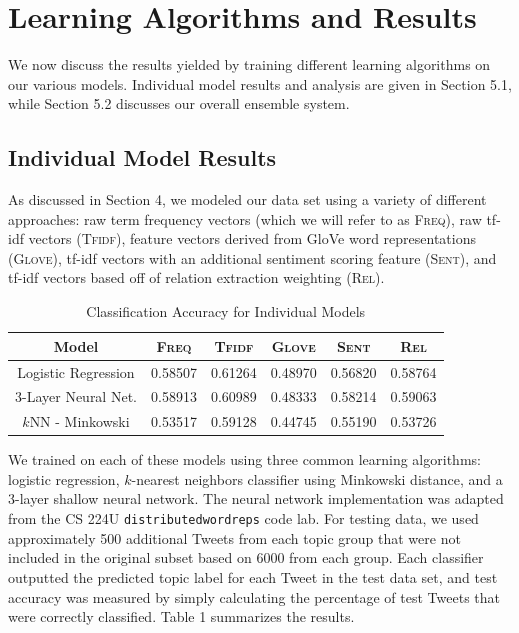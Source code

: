 \documentclass[11pt]{article}
\begin{document}
\section{Learning Algorithms and Results}

We now discuss the results yielded by training different learning algorithms on our various models. Individual model results and analysis are given in Section 5.1, while Section 5.2 discusses our overall ensemble system.

\subsection{Individual Model Results}

As discussed in Section 4, we modeled our data set using a variety of different approaches: raw term frequency vectors (which we will refer to as \textsc{Freq}), raw tf-idf vectors (\textsc{Tfidf}), feature vectors derived from GloVe word representations (\textsc{Glove}), tf-idf vectors with an additional sentiment scoring feature (\textsc{Sent}), and tf-idf vectors based off of relation extraction weighting (\textsc{Rel}).

\begin{table}[]
  \centering
  \begin{tabular}{|c||c|c|c|c|c|}
  \hline \textbf{Model} & \textsc{Freq} & \textsc{Tfidf} & \textsc{Glove} & \textsc{Sent} & \textsc{Rel} \\ \hline \hline
  Logistic Regression & 0.58507  & 0.61264  & 0.48970 & 0.56820 & 0.58764 \\ \hline
  3-Layer Neural Net. & 0.58913 & 0.60989 & 0.48333 & 0.58214 & 0.59063 \\ \hline
  $k$NN - Minkowski  & 0.53517 & 0.59128 & 0.44745 & 0.55190 & 0.53726 \\ \hline
  \end{tabular}
  \label{individual}
  \caption{Classification Accuracy for Individual Models}
\end{table}

We trained on each of these models using three common learning algorithms: logistic regression, $k$-nearest neighbors classifier using Minkowski distance, and a 3-layer shallow neural network. The neural network implementation was adapted from the CS 224U \texttt{distributedwordreps} code lab. For testing data, we used approximately 500 additional Tweets from each topic group that were not included in the original subset based on 6000 from each group. Each classifier outputted the predicted topic label for each Tweet in the test data set, and test accuracy was measured by simply calculating the percentage of test Tweets that were correctly classified. Table 1 summarizes the results.
\end{document}
